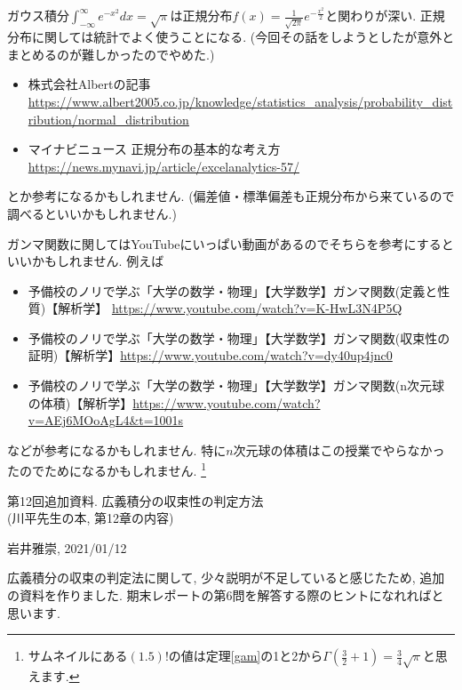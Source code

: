 \documentclass[dvipdfmx,a4paper,11pt]{article}
\theoremstyle{definition}
\begin{document}
 \vspace{11pt}
 
ガウス積分$ \int_{-\infty}^{\infty} e^{-x^2}dx = \sqrt{\pi}$は正規分布$f(x)=\frac{1}{\sqrt{2\pi}}e^{-\frac{x^2}{2}}$と関わりが深い.
正規分布に関しては統計でよく使うことになる. (今回その話をしようとしたが意外とまとめるのが難しかったのでやめた.)
\begin{itemize}
\item 株式会社Albertの記事 \url{https://www.albert2005.co.jp/knowledge/statistics_analysis/probability_distribution/normal_distribution}
\item マイナビニュース 正規分布の基本的な考え方 \url{https://news.mynavi.jp/article/excelanalytics-57/} 
\end{itemize}

とか参考になるかもしれません. (偏差値・標準偏差も正規分布から来ているので調べるといいかもしれません.)

ガンマ関数に関してはYouTubeにいっぱい動画があるのでそちらを参考にするといいかもしれません.
例えば
\begin{itemize}
\item 予備校のノリで学ぶ「大学の数学・物理」【大学数学】ガンマ関数(定義と性質)【解析学】 \url{https://www.youtube.com/watch?v=K-HwL3N4P5Q}
\item 予備校のノリで学ぶ「大学の数学・物理」【大学数学】ガンマ関数(収束性の証明)【解析学】\url{https://www.youtube.com/watch?v=dy40up4jnc0}
\item 予備校のノリで学ぶ「大学の数学・物理」【大学数学】ガンマ関数(n次元球の体積)【解析学】\url{https://www.youtube.com/watch?v=AEj6MOoAgL4&t=1001s}
\end{itemize}
などが参考になるかもしれません.
特に$n$次元球の体積はこの授業でやらなかったのでためになるかもしれません.
\footnote{サムネイルにある$(1.5)!$の値は定理\ref{gam}の1と2から$\Gamma(\frac{3}{2}+1)=\frac{3}{4}\sqrt{\pi}$と思えます.}

\newpage

\begin{center}
{\Large 第12回追加資料. 広義積分の収束性の判定方法 \\ (川平先生の本, 第12章の内容)}
\end{center}

\begin{flushright}
 岩井雅崇, 2021/01/12
\end{flushright}

広義積分の収束の判定法に関して, 少々説明が不足していると感じたため, 追加の資料を作りました. 期末レポートの第6問を解答する際のヒントになれればと思います.
\end{document}
